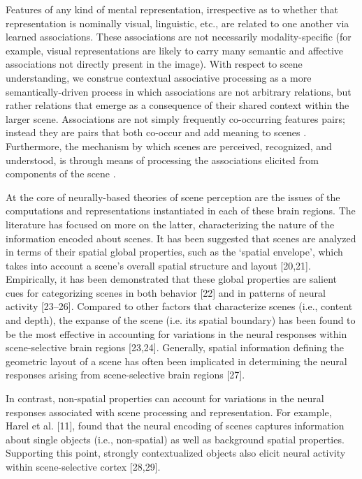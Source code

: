 \documentclass[english]{article}
\begin{document}
Features of any kind of mental representation, irrespective as to whether that
representation is nominally visual, linguistic, etc., are related to one another
via learned associations\citep{aminoff2015associative}.
%
These associations are not necessarily modality-specific (for example, visual
representations are likely to carry many semantic and affective associations not
directly present in the image)\citep{aminoff2015associative}.
%
With respect to scene understanding, we construe contextual associative
processing as a more semantically-driven process in which associations are not
arbitrary relations, but rather relations that emerge as a consequence of their
shared context within the larger scene.
%
Associations are not simply frequently co-occurring features pairs; instead they
are pairs that both co-occur and add meaning to scenes
\citep{aminoff2015associative}.
%
Furthermore, the mechanism by which scenes are perceived, recognized, and
understood, is through means of processing the associations elicited from
components of the scene \citep{aminoff2015associative}.

%
At the core of neurally-based theories of scene perception are the issues of the
computations and representations instantiated in each of these brain regions.
The literature has focused on more on the latter, characterizing the nature of
the information encoded about scenes\citep{aminoff2015associative}.
%
It has been suggested that scenes are analyzed in terms of their spatial global
properties, such as the ‘spatial envelope’, which takes into account a scene’s
overall spatial structure and layout [20,21]\citep{aminoff2015associative}.
%
Empirically, it has been demonstrated that these global properties are salient
cues for categorizing scenes in both behavior [22] and in patterns of neural
activity [23–26]\citep{aminoff2015associative}.
%
Compared to other factors that characterize scenes (i.e., content and
depth), the expanse of the scene (i.e. its spatial boundary) has been found to
be the most effective in accounting for variations in the neural responses
within scene-selective brain regions [23,24]\citep{aminoff2015associative}.
%
Generally, spatial information defining the geometric layout of a scene has
often been implicated in determining the neural responses arising from
scene-selective brain regions [27]\citep{aminoff2015associative}.

%
In contrast, non-spatial properties can account for variations in the neural
responses associated with scene processing and representation\citep{aminoff2015associative}.
%
For example, Harel et al. [11], found that the neural encoding of scenes
captures information about single objects (i.e., non-spatial) as well as
background spatial properties\citep{aminoff2015associative}.
%
Supporting this point, strongly contextualized objects also elicit neural
activity within scene-selective cortex [28,29]\citep{aminoff2015associative}.
\end{document}
